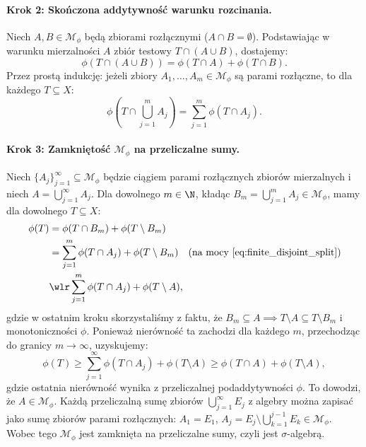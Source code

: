 \begin{dow}
    \paragraph{Krok 2: Skończona addytywność warunku rozcinania.}
    Niech $A, B \in \mathcal{M}_\phi$ będą zbiorami rozłącznymi ($A \cap B = \emptyset$). Podstawiając w warunku mierzalności $A$ zbiór testowy $T \cap (A \cup B)$, dostajemy:
    \begin{equation}\label{eq:disjoint_split}
        \phi(T \cap (A \cup B)) = \phi(T \cap A) + \phi(T \cap B).
    \end{equation}
    Przez prostą indukcję: jeżeli zbiory $A_1, \dots, A_m \in \mathcal{M}_\phi$ są parami rozłączne, to dla każdego $T \subseteq X$:
    \begin{equation}\label{eq:finite_disjoint_split}
        \phi\left(T \cap \bigcup_{j=1}^m A_j\right) = \sum_{j=1}^m \phi(T \cap A_j).
    \end{equation}

    \paragraph{Krok 3: Zamkniętość $\mathcal{M}_\phi$ na przeliczalne sumy.}
    Niech $\{A_j\}_{j=1}^\infty \subseteq \mathcal{M}_\phi$ będzie ciągiem parami rozłącznych zbiorów mierzalnych i niech $A = \bigcup_{j=1}^\infty A_j$. Dla dowolnego $m \in \N$, kładąc $B_m = \bigcup_{j=1}^m A_j \in \mathcal{M}_\phi$, mamy dla dowolnego $T \subseteq X$:
    \begin{align}
        \phi(T) & = \phi(T \cap B_m) + \phi(T \setminus B_m)                                                                      \\
                & = \sum_{j=1}^m \phi(T \cap A_j) + \phi(T \setminus B_m) \quad \text{(na mocy \eqref{eq:finite_disjoint_split})} \\
                & \wlr \sum_{j=1}^m \phi(T \cap A_j) + \phi(T \setminus A),
    \end{align}
    gdzie w ostatnim kroku skorzystaliśmy z faktu, że $B_m \subseteq A \implies T \setminus A \subseteq T \setminus B_m$ i monotoniczności $\phi$.
    Ponieważ nierówność ta zachodzi dla każdego $m$, przechodząc do granicy $m \to \infty$, uzyskujemy:
    \begin{equation*}
        \phi(T) \ge \sum_{j=1}^\infty \phi(T \cap A_j) + \phi(T \setminus A) \ge \phi(T \cap A) + \phi(T \setminus A),
    \end{equation*}
    gdzie ostatnia nierówność wynika z przeliczalnej podaddytywności $\phi$. To dowodzi, że $A \in \mathcal{M}_\phi$. Każdą przeliczalną sumę zbiorów $\bigcup_{j=1}^\infty E_j$ z algebry można zapisać jako sumę zbiorów parami rozłącznych: $A_1 = E_1$, $A_j = E_j \setminus \bigcup_{k=1}^{j-1} E_k \in \mathcal{M}_\phi$.
    Wobec tego $\mathcal{M}_\phi$ jest zamknięta na przeliczalne sumy, czyli jest $\sigma$-algebrą.


\end{dow}
